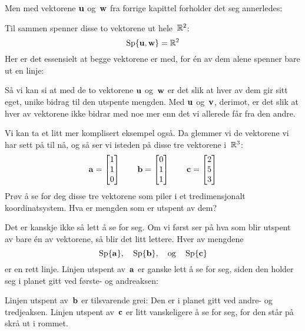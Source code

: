 Men med vektorene $\mathbf{u}$ og~$\mathbf{w}$ fra forrige kapittel forholder det seg
annerledes:
\begin{center}
\end{center}
Til sammen spenner disse to vektorene ut hele~$\mathbb{R}^2$:
\[
\operatorname{Sp}\{ \mathbf{u}, \mathbf{w} \} = \mathbb{R}^2
\]
Her er det essensielt at begge vektorene er med, for én av dem alene
spenner bare ut en linje:
\begin{center}
\end{center}

Så vi kan si at med de to vektorene $\mathbf{u}$ og~$\mathbf{w}$ er det slik at hver
av dem gir sitt eget, unike bidrag til den utspente mengden.  Med $\mathbf{u}$
og~$\mathbf{v}$, derimot, er det slik at hver av vektorene ikke bidrar med noe
mer enn det vi allerede får fra den andre.

\medskip%
Vi kan ta et litt mer komplisert eksempel også.  Da glemmer vi de
vektorene vi har sett på til nå, og så ser vi isteden på disse tre
vektorene i~$\mathbb{R}^3$:
\[
\mathbf{a} = \begin{bmatrix} 1 \\ 1 \\ 0 \end{bmatrix}
\qquad
\mathbf{b} = \begin{bmatrix} 0 \\ 1 \\ 1 \end{bmatrix}
\qquad
\mathbf{c} = \begin{bmatrix} 2 \\ 5 \\ 3 \end{bmatrix}
\]
Prøv å se for deg disse tre vektorene som piler i et tredimensjonalt
koordinatsystem.  Hva er mengden som er utspent av dem?

Det er kanskje ikke så lett å se for seg.  Om vi først ser på hva som
blir utspent av bare én av vektorene, så blir det litt lettere.  Hver
av mengdene
\[
\operatorname{Sp} \{ \mathbf{a} \},\quad
\operatorname{Sp} \{ \mathbf{b} \},\quad\text{og}\quad
\operatorname{Sp} \{ \mathbf{c} \}
\]
er en rett linje.  Linjen utspent av~$\mathbf{a}$ er ganske lett å se for seg,
siden den holder seg i planet gitt ved første- og andreaksen:
\begin{center}
\end{center}
Linjen utspent av~$\mathbf{b}$ er tilsvarende grei: Den er i planet gitt ved
andre- og tredjeaksen.  Linjen utspent av~$\mathbf{c}$ er litt vanskeligere å
se for seg, for den står på skrå ut i rommet.

